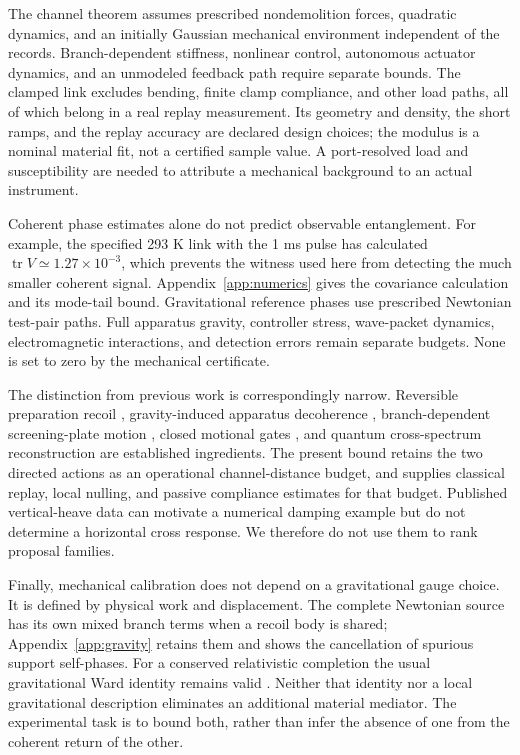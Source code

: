 \documentclass[aps,pra,reprint,amsmath,amssymb,longbibliography,floatfix]{revtex4-2}
\newcommand{\tr}{\operatorname{tr}}
\begin{document}
The channel theorem assumes prescribed nondemolition forces, quadratic dynamics, and an initially Gaussian mechanical environment independent of the records. Branch-dependent stiffness, nonlinear control, autonomous actuator dynamics, and an unmodeled feedback path require separate bounds. The clamped link excludes bending, finite clamp compliance, and other load paths, all of which belong in a real replay measurement. Its geometry and density, the short ramps, and the replay accuracy are declared design choices; the modulus is a nominal material fit, not a certified sample value. A port-resolved load and susceptibility are needed to attribute a mechanical background to an actual instrument.

Coherent phase estimates alone do not predict observable entanglement. For example, the specified 293 K link with the 1 ms pulse has calculated $\tr V\simeq1.27\times10^{-3}$, which prevents the witness used here from detecting the much smaller coherent signal. Appendix~\ref{app:numerics} gives the covariance calculation and its mode-tail bound. Gravitational reference phases use prescribed Newtonian test-pair paths. Full apparatus gravity, controller stress, wave-packet dynamics, electromagnetic interactions, and detection errors remain separate budgets. None is set to zero by the mechanical certificate.

The distinction from previous work is correspondingly narrow. Reversible preparation recoil \cite{Celeri}, gravity-induced apparatus decoherence \cite{Gunnink}, branch-dependent screening-plate motion \cite{Kamp}, closed motional gates \cite{Molmer}, and quantum cross-spectrum reconstruction \cite{PazSilva} are established ingredients. The present bound retains the two directed actions as an operational channel-distance budget, and supplies classical replay, local nulling, and passive compliance estimates for that budget. Published vertical-heave data \cite{Hermsdorf} can motivate a numerical damping example but do not determine a horizontal cross response. We therefore do not use them to rank proposal families.

Finally, mechanical calibration does not depend on a gravitational gauge choice. It is defined by physical work and displacement. The complete Newtonian source has its own mixed branch terms when a recoil body is shared; Appendix~\ref{app:gravity} retains them and shows the cancellation of spurious support self-phases. For a conserved relativistic completion the usual gravitational Ward identity remains valid \cite{Danielson,Christodoulou}. Neither that identity nor a local gravitational description eliminates an additional material mediator. The experimental task is to bound both, rather than infer the absence of one from the coherent return of the other.
\end{document}
